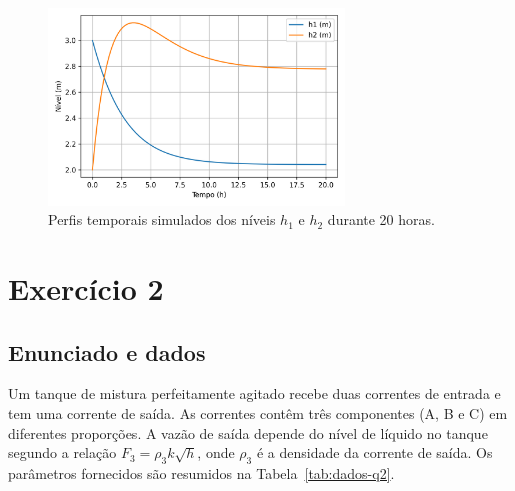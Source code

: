 \documentclass{article}
\begin{document}


\begin{figure}[ht]
  \centering
  \includegraphics[width=0.7\textwidth]{figuras/questao1_niveis.png}
  \caption{Perfis temporais simulados dos níveis $h_1$ e $h_2$ durante 20 horas.}
  \label{fig:questao1}
\end{figure}

\section{Exercício 2}

\subsection*{Enunciado e dados}
Um tanque de mistura perfeitamente agitado recebe duas correntes de entrada e tem uma corrente de saída. As correntes contêm três componentes (A, B e C) em diferentes proporções. A vazão de saída depende do nível de líquido no tanque segundo a relação $F_3 = \rho_3 k\sqrt{h}$, onde $\rho_3$ é a densidade da corrente de saída. Os parâmetros fornecidos são resumidos na Tabela~\ref{tab:dados-q2}.
\end{document}
